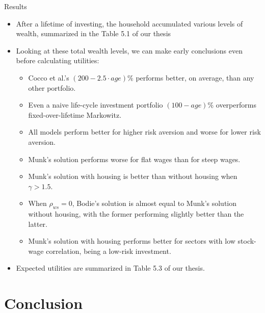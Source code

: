 \documentclass{beamer}
\begin{document}
\begin{frame}[allowframebreaks]{Results}
\begin{itemize}
\framebreak	

\framebreak

\framebreak

	\item After a lifetime of investing, the household accumulated various levels of wealth, summarized in the Table 5.1 of our thesis
	\item Looking at these total wealth levels, we can make early conclusions even before calculating utilities:
	\begin{itemize}
\item Cocco et al.'s $(200-2.5\cdot age)\%$ performs better, on average, than any other portfolio.
\item Even a naive life-cycle investment portfolio $(100-age)\%$ overperforms fixed-over-lifetime Markowitz.
\item All models perform better for higher risk aversion and worse for lower risk aversion.
\item Munk's solution performs worse for flat wages than for steep wages.
\item Munk's solution with housing is better than without housing when $\gamma > 1.5$.
\item When $\rho_{ws}=0$, Bodie's solution is almost equal to Munk's solution without housing, with the former performing slightly better than the latter.
\item Munk's solution with housing performs better for sectors with low stock-wage correlation, being a low-risk investment.
	\end{itemize}

	\item Expected utilities are summarized in Table 5.3 of our thesis.
  \end{itemize}
\end{frame}

\section{Conclusion}
\end{document}
